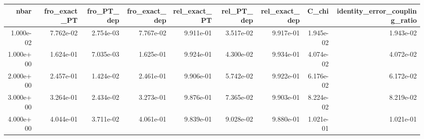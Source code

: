 \begin{tabular}{rrrrrrrrr}
\toprule
nbar & fro_exact_PT & fro_PT_dep & fro_exact_dep & rel_exact_PT & rel_PT_dep & rel_exact_dep & C_chi & identity_error_coupling_ratio \\
\midrule
1.000e-02 & 7.762e-02 & 2.754e-03 & 7.767e-02 & 9.911e-01 & 3.517e-02 & 9.917e-01 & 1.945e-02 & 1.943e-02 \\
1.000e+00 & 1.624e-01 & 7.035e-03 & 1.625e-01 & 9.924e-01 & 4.300e-02 & 9.934e-01 & 4.074e-02 & 4.072e-02 \\
2.000e+00 & 2.457e-01 & 1.424e-02 & 2.461e-01 & 9.906e-01 & 5.742e-02 & 9.922e-01 & 6.176e-02 & 6.172e-02 \\
3.000e+00 & 3.264e-01 & 2.434e-02 & 3.273e-01 & 9.876e-01 & 7.365e-02 & 9.903e-01 & 8.224e-02 & 8.219e-02 \\
4.000e+00 & 4.044e-01 & 3.711e-02 & 4.061e-01 & 9.839e-01 & 9.028e-02 & 9.880e-01 & 1.021e-01 & 1.021e-01 \\
\bottomrule
\end{tabular}
